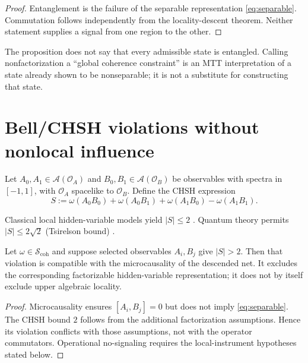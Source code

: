 \documentclass[11pt]{article}
\begin{document}
\begin{proof}
Entanglement is the failure of the separable representation
\eqref{eq:separable}.  Commutation follows independently from the
locality-descent theorem.  Neither statement supplies a signal from one
region to the other.
\end{proof}

\begin{remark}
The proposition does not say that every admissible state is entangled.
Calling nonfactorization a ``global coherence constraint'' is an MTT
interpretation of a state already shown to be nonseparable; it is not a
substitute for constructing that state.
\end{remark}

\section{Bell/CHSH violations without nonlocal influence}

Let $A_0,A_1\in\mathcal{A}(\mathcal{O}_A)$ and $B_0,B_1\in\mathcal{A}(\mathcal{O}_B)$ be observables with spectra in $[-1,1]$,
with $\mathcal{O}_A$ spacelike to $\mathcal{O}_B$.
Define the CHSH expression
\begin{equation}\label{eq:CHSH}
S:=\omega(A_0B_0)+\omega(A_0B_1)+\omega(A_1B_0)-\omega(A_1B_1).
\end{equation}

Classical local hidden-variable models yield $|S|\le 2$ \cite{Bell1964,CHSH1969}. Quantum theory permits $|S|\le 2\sqrt{2}$
(Tsirelson bound) \cite{Tsirelson1980}.

\begin{proposition}\label{prop:bell}
Let $\omega\in\mathcal{S}_{\mathrm{coh}}$ and suppose selected observables
$A_i,B_j$ give $|S|>2$.  Then that violation is compatible with the
microcausality of the descended net.  It excludes the corresponding
factorizable hidden-variable representation; it does not by itself exclude
upper algebraic locality.
\end{proposition}

\begin{proof}
Microcausality ensures $[A_i,B_j]=0$ but does not imply
\eqref{eq:separable}.  The CHSH bound $2$ follows from the additional
factorization assumptions.  Hence its violation conflicts with those
assumptions, not with the operator commutators.  Operational no-signaling
requires the local-instrument hypotheses stated below.
\end{proof}
\end{document}
